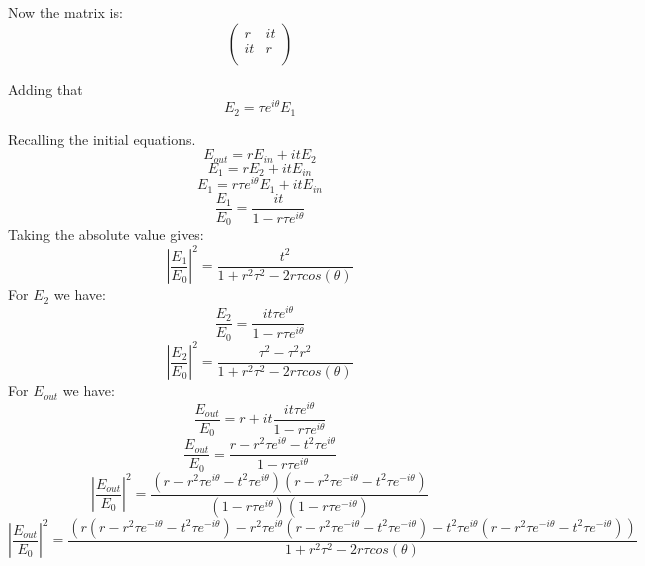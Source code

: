 Now the matrix is:
\begin{equation}
\begin{pmatrix}
r & it \\
it & r \\
\end{pmatrix}
\end{equation}

Adding that $$E_2=\tau e^{i\theta}E_1$$

Recalling the initial equations.
\begin{equation}
E_{out}=rE_{in}+itE_2
\end{equation}
\begin{equation}
E_{1}=rE_2+itE_{in}
\end{equation}
\begin{equation}
E_{1}=r\tau e^{i\theta}E_1+itE_{in}
\end{equation}
%
\begin{equation}
\frac{E_{1}}{E_{0}}=\frac{it}{1-r\tau e^{i\theta}}
\end{equation}
Taking the absolute value gives:
\begin{equation}
\left|\frac{E_{1}}{E_{0}}\right |^2=\frac{t^2}{1+r^2\tau^2-2r\tau cos(\theta)}
\end{equation}
For $E_{2}$ we have:
\begin{equation}
\frac{E_{2}}{E_{0}}=\frac{it\tau e^{i\theta}}{1-r\tau e^{i\theta}}
\end{equation}
%
\begin{equation}
\left |\frac{E_{2}}{E_{0}}\right |^2=\frac{\tau^2-\tau^2r^2}{1+r^2\tau^2-2r\tau cos(\theta)}
\end{equation}
For $E_{out}$ we have:
\begin{equation}
\frac{E_{out}}{E_{0}}=r+it\frac{it\tau e^{i\theta}}{1-r\tau e^{i\theta}}
\end{equation}
\begin{equation}
\frac{E_{out}}{E_{0}}=\frac{r-r^2\tau e^{i\theta}-t^2\tau e^{i\theta}}{1-r\tau e^{i\theta}}
\end{equation}
\begin{equation}
\left |\frac{E_{out}}{E_{0}}\right|^2=\frac{(r-r^2\tau e^{i\theta}-t^2\tau e^{i\theta})(r-r^2\tau e^{-i\theta}-t^2\tau e^{-i\theta})}{(1-r\tau e^{i\theta})(1-r\tau e^{-i\theta})}
\end{equation}
\begin{equation}
\left |\frac{E_{out}}{E_{0}}\right|^2=\frac{(r(r-r^2\tau e^{-i\theta}-t^2\tau e^{-i\theta})-r^2\tau e^{i\theta}(r-r^2\tau e^{-i\theta}-t^2\tau e^{-i\theta})-t^2\tau e^{i\theta}(r-r^2\tau e^{-i\theta}-t^2\tau e^{-i\theta}))}{1+r^2\tau^2-2r\tau cos(\theta)}
\end{equation}

